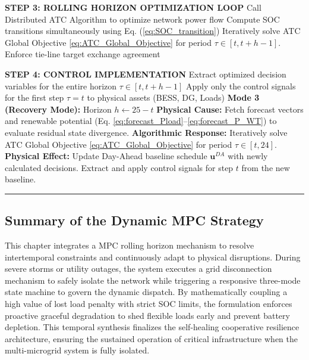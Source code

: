 \begin{algorithmic}[1]
        \State \textbf{STEP 3: ROLLING HORIZON OPTIMIZATION LOOP}
        \State Call Distributed ATC Algorithm to optimize network power flow
        \State Compute SOC transitions simultaneously using Eq. (\ref{eq:SOC_transition})
        \State Iteratively solve ATC Global Objective \eqref{eq:ATC_Global_Objective} for period $\tau \in [t, t+h-1]$.
        \State Enforce tie-line target exchange agreement 
        
        \State \textbf{STEP 4: CONTROL IMPLEMENTATION}
        \State Extract optimized decision variables for the entire horizon $\tau \in [t, t+h-1]$
        \State Apply only the control signals for the first step $\tau = t$ to physical assets (BESS, DG, Loads)
        \State \textbf{Mode 3 (Recovery Mode):}
        \State Horizon $h \gets 25 - t$
        \State \textbf{Physical Cause:} Fetch forecast vectors and renewable potential 
        \Statex \hspace{2.6cm} (Eq. \ref{eq:forecast_Pload}--\ref{eq:forecast_P_WT}) to evaluate residual state divergence.
        \State \textbf{Algorithmic Response:} Iteratively solve ATC Global Objective 
        \Statex \hspace{3.7cm} \eqref{eq:ATC_Global_Objective} for period $\tau \in [t, 24]$. 
        \State \textbf{Physical Effect:} Update Day-Ahead baseline schedule $\mathbf{u}^{DA}$ 
        \Statex \hspace{2.6cm} with newly calculated decisions.
        \State Extract and apply control signals for step $t$ from the new baseline.
    \EndIf
\EndFor
\end{algorithmic}
\noindent\rule{\linewidth}{0.8pt}
\par\vspace{1em}

\subsection{Summary of the Dynamic MPC Strategy}

This chapter integrates a MPC rolling horizon mechanism to resolve intertemporal constraints and continuously adapt to physical disruptions. During severe storms or utility outages, the system executes a grid disconnection mechanism to safely isolate the network while triggering a responsive three-mode state machine to govern the dynamic dispatch. By mathematically coupling a high value of lost load penalty with strict SOC limits, the formulation enforces proactive graceful degradation to shed flexible loads early and prevent battery depletion. This temporal synthesis finalizes the self-healing cooperative resilience architecture, ensuring the sustained operation of critical infrastructure when the multi-microgrid system is fully isolated.

